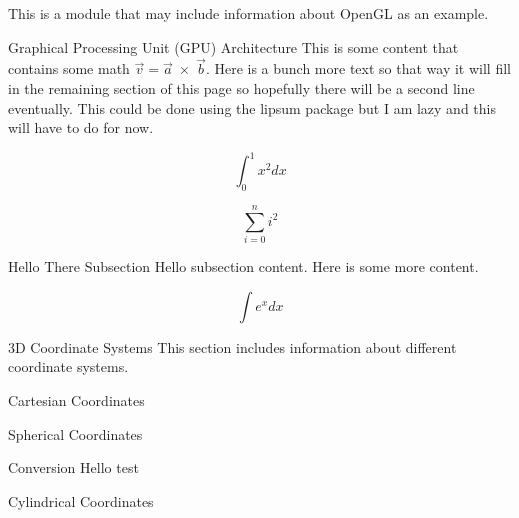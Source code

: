 \documentclass[10pt]{article}
\begin{document}


This is a module that may include information about OpenGL as an example.

\begin{section}{Graphical Processing Unit (GPU) Architecture}
This is some content that contains some math $\textstyle \vec{v} = \vec{a}\;\times\;\vec{b}$. Here is a bunch more text so that way it will fill in the remaining section of this page so hopefully there will be a second line eventually. This could be done using the lipsum package but I am lazy and this will have to do for now.

\begin{equation}
	\int_0^1 x^2 dx
\end{equation}

\begin{equation}
	\sum_{i=0}^{n}i^2
\end{equation}



\begin{subsection}{Hello There Subsection}
	Hello subsection content. Here is some more content.
	
	\begin{equation}
		\int e^x dx
	\end{equation}
\end{subsection}

\end{section}

\begin{section}{3D Coordinate Systems}
	This section includes information about different coordinate systems.
	
	\begin{subsection}{Cartesian Coordinates}
	
	\end{subsection}

	\begin{subsection}{Spherical Coordinates}
	
		\begin{subsubsection}{Conversion}
			Hello test
		\end{subsubsection}
	\end{subsection}
	
	\begin{subsection}{Cylindrical Coordinates}
	
	\end{subsection}
\end{section}
\end{document}
